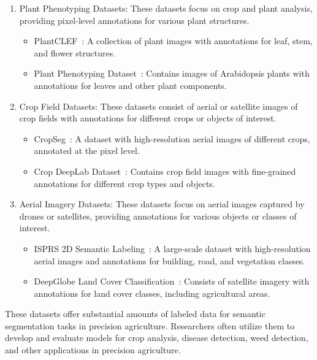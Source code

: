 \documentclass[runningheads]{llncs}
\begin{document}
\begin{enumerate}
\item Plant Phenotyping Datasets: These datasets focus on crop and plant analysis, providing pixel-level annotations for various plant structures.
\begin{itemize}
\item PlantCLEF~\cite{plantclef}: A collection of plant images with annotations for leaf, stem, and flower structures.
\item Plant Phenotyping Dataset~\cite{plant_phenotyping_dataset}: Contains images of Arabidopsis plants with annotations for leaves and other plant components.
\end{itemize}
\item Crop Field Datasets: These datasets consist of aerial or satellite images of crop fields with annotations for different crops or objects of interest.
\begin{itemize}
\item CropSeg~\cite{cropseg}: A dataset with high-resolution aerial images of different crops, annotated at the pixel level.
\item Crop DeepLab Dataset~\cite{crop_deeplab_dataset}: Contains crop field images with fine-grained annotations for different crop types and objects.
\end{itemize}
\item Aerial Imagery Datasets: These datasets focus on aerial images captured by drones or satellites, providing annotations for various objects or classes of interest.
\begin{itemize}
\item ISPRS 2D Semantic Labeling~\cite{isprs_semantic_labeling}: A large-scale dataset with high-resolution aerial images and annotations for building, road, and vegetation classes.
\item DeepGlobe Land Cover Classification~\cite{deepglobe_land_cover}: Consists of satellite imagery with annotations for land cover classes, including agricultural areas.
\end{itemize}
\end{enumerate}

These datasets offer substantial amounts of labeled data for semantic segmentation tasks in precision agriculture. Researchers often utilize them to develop and evaluate models for crop analysis, disease detection, weed detection, and other applications in precision agriculture.
\end{document}
